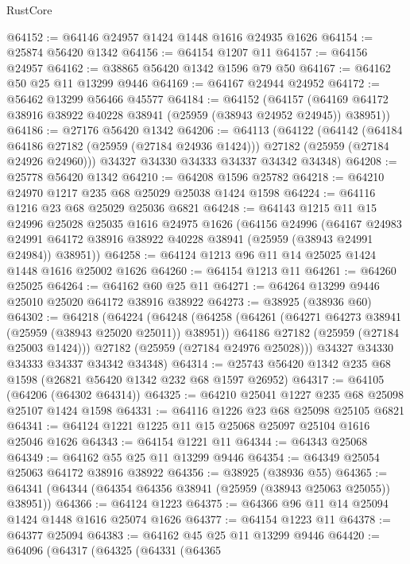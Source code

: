 \begin{lexlean}{RustCore}
\begin{coremodule}
@64152 := @64146 @24957 @1424 @1448 @1616 @24935 @1626
@64154 := @25874 @56420 @1342
@64156 := @64154 @1207 @11
@64157 := @64156 @24957
@64162 := @38865 @56420 @1342 @1596 @79 @50
@64167 := @64162 @50 @25 @11 @13299 @9446
@64169 := @64167 @24944 @24952
@64172 := @56462 @13299 @56466 @45577
@64184 := @64152
    (@64157 (@64169 @64172 @38916 @38922 @40228 @38941 (@25959 (@38943 @24952 @24945)) @38951))
@64186 := @27176 @56420 @1342
@64206 := @64113
    (@64122
      (@64142
        (@64184 @64186 @27182 (@25959 (@27184 @24936 @1424)))
        @27182
        (@25959 (@27184 @24926 @24960)))
      @34327
      @34330
      @34333
      @34337
      @34342
      @34348)
@64208 := @25778 @56420 @1342
@64210 := @64208 @1596 @25782
@64218 := @64210 @24970 @1217 @235 @68 @25029 @25038 @1424 @1598
@64224 := @64116 @1216 @23 @68 @25029 @25036 @6821
@64248 := @64143
    @1215
    @11
    @15
    @24996
    @25028
    @25035
    @1616
    @24975
    @1626
    (@64156
      @24996
      (@64167
        @24983
        @24991
        @64172
        @38916
        @38922
        @40228
        @38941
        (@25959 (@38943 @24991 @24984))
        @38951))
@64258 := @64124 @1213 @96 @11 @14 @25025 @1424 @1448 @1616 @25002 @1626
@64260 := @64154 @1213 @11
@64261 := @64260 @25025
@64264 := @64162 @60 @25 @11
@64271 := @64264 @13299 @9446 @25010 @25020 @64172 @38916 @38922
@64273 := @38925 (@38936 @60)
@64302 := @64218
    (@64224
      (@64248
        (@64258
          (@64261 (@64271 @64273 @38941 (@25959 (@38943 @25020 @25011)) @38951))
          @64186
          @27182
          (@25959 (@27184 @25003 @1424)))
        @27182
        (@25959 (@27184 @24976 @25028)))
      @34327
      @34330
      @34333
      @34337
      @34342
      @34348)
@64314 := @25743 @56420 @1342 @235 @68 @1598 (@26821 @56420 @1342 @232 @68 @1597 @26952)
@64317 := @64105 (@64206 (@64302 @64314))
@64325 := @64210 @25041 @1227 @235 @68 @25098 @25107 @1424 @1598
@64331 := @64116 @1226 @23 @68 @25098 @25105 @6821
@64341 := @64124 @1221 @1225 @11 @15 @25068 @25097 @25104 @1616 @25046 @1626
@64343 := @64154 @1221 @11
@64344 := @64343 @25068
@64349 := @64162 @55 @25 @11 @13299 @9446
@64354 := @64349 @25054 @25063 @64172 @38916 @38922
@64356 := @38925 (@38936 @55)
@64365 := @64341 (@64344 (@64354 @64356 @38941 (@25959 (@38943 @25063 @25055)) @38951))
@64366 := @64124 @1223
@64375 := @64366 @96 @11 @14 @25094 @1424 @1448 @1616 @25074 @1626
@64377 := @64154 @1223 @11
@64378 := @64377 @25094
@64383 := @64162 @45 @25 @11 @13299 @9446
@64420 := @64096
    (@64317
      (@64325
        (@64331
          (@64365

\end{coremodule}
\end{lexlean}
